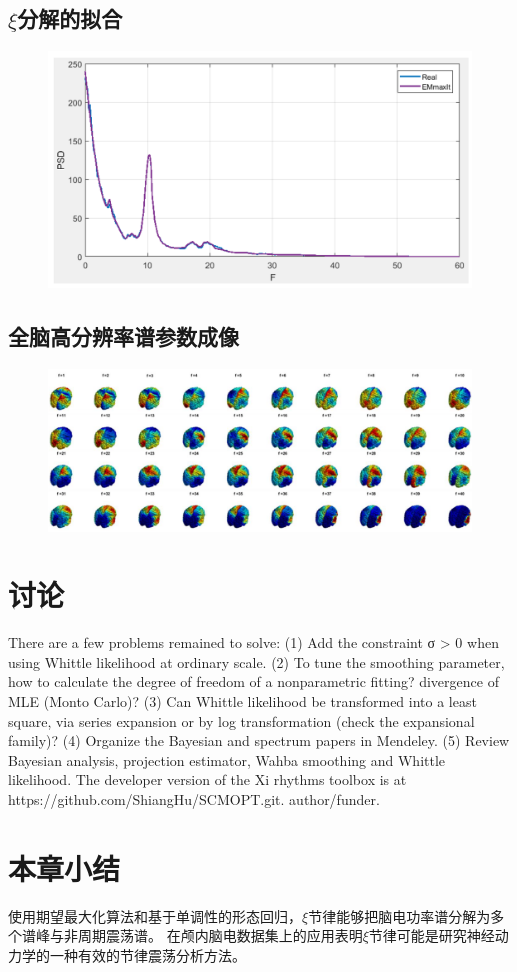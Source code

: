 \subsection{$\xi$分解的拟合}
\begin{figure}[!ht]
	\includegraphics[width=15cm]{pic/xipi/figure3_1.png}
	\caption{}
	\label{fig3_1}
\end{figure}
\subsection{全脑高分辨率谱参数成像}
\begin{figure}[!ht]
	\includegraphics[width=15cm]{pic/xipi/figure4.png}
	\caption{}
	\label{fig4}
\end{figure}

\section{讨论}
There are a few problems remained to solve: (1) Add the constraint σ > 0 when using Whittle likelihood at
ordinary scale. (2) To tune the smoothing parameter, how to calculate the degree of freedom of a
nonparametric fitting? divergence of MLE (Monto Carlo)? (3) Can Whittle likelihood be transformed into a least
square, via series expansion or by log transformation (check the expansional family)? (4) Organize the Bayesian
and spectrum papers in Mendeley. (5) Review Bayesian analysis, projection estimator, Wahba smoothing and
Whittle likelihood.
The developer version of the Xi rhythms toolbox is at https://github.com/ShiangHu/SCMOPT.git.
author/funder. 

\section{本章小结}
使用期望最大化算法和基于单调性的形态回归，$\xi$节律能够把脑电功率谱分解为多个谱峰与非周期震荡谱。 在颅内脑电数据集上的应用表明$\xi$节律可能是研究神经动力学的一种有效的节律震荡分析方法。